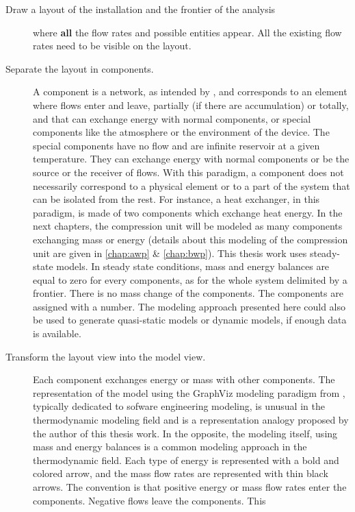 \begin{description}
\item [Draw a layout of the installation and the frontier of the
  analysis]where \textbf{all} the flow rates and possible entities
  appear. All the existing flow rates need to be visible on the
  layout.
\item[Separate the layout in components.] A component is a network, as
  intended by \citet[p.\,24--25]{Borel-Favrat-2010a}, and corresponds
  to an element where flows enter and leave, partially (if there are
  accumulation) or totally, and that can exchange energy with normal
  components, or special components like the atmosphere or the
  environment of the device. The special components have no flow and
  are infinite reservoir at a given temperature. They can exchange
  energy with normal components or be the source or the receiver of
  flows. With this paradigm, a component does not necessarily
  correspond to a physical element or to a part of the system that can
  be isolated from the rest. For instance, a heat exchanger, in this
  paradigm, is made of two components which exchange heat energy. In
  the next chapters, the compression unit will be modeled as many
  components exchanging mass or energy (details about this modeling of
  the compression unit are given in \cref{chap:awp} \&
  \cref{chap:bwp}). This thesis work uses steady-state models. In
  steady state conditions, mass and energy balances are equal to zero
  for every components, as for the whole system delimited by a
  frontier. There is no mass change of the components. The components
  are assigned with a number. The modeling approach presented here
  could also be used to generate quasi-static models or dynamic
  models, if enough data is available.
\item[Transform the layout view into the model view.] Each component
  exchanges energy or mass with other components. The representation
  of the model using the GraphViz modeling paradigm from
  \citet{Gansner-North-2000a}, typically dedicated to sofware
  engineering modeling, is unusual in the thermodynamic modeling field
  and is a representation analogy proposed by the author of this
  thesis work. In the opposite, the modeling itself, using mass and
  energy balances is a common modeling approach in the thermodynamic
  field. Each type of energy is represented with a bold and colored
  arrow, and the mass flow rates are represented with thin black
  arrows. The convention is that positive energy or mass flow rates
  enter the components. Negative flows leave the components. This

\end{description}
